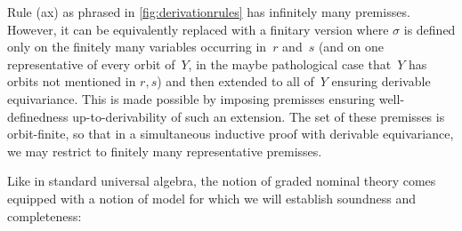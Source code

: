 \documentclass[a4paper,UKenglish,cleveref,thm-restate,numberwithinsect,final]{lipics-v2021}
\newcommand{\sigf}{\Sigma_{\mathsf f}}
\newcommand{\sigb}{\Sigma_{\mathsf b}}
\newcommand{\fresh}{\mathbin{\#}}
\theoremstyle{plain}
\numberwithin{equation}{section}
\newcommand{\+}[1]{\mathcal{#1}\xspace}
\theoremstyle{definition}
\begin{document}
\begin{remark}\label{rem:ax}
  Rule (ax) as phrased in \cref{fig:derivationrules} has infinitely
  many premisses. However, it can be equivalently replaced with a
  finitary version where $\sigma$ is defined only on the finitely many
  variables occurring in~$r$ and~$s$ (and on one representative of
  every orbit of~$Y$, in the maybe pathological case that~$Y$ has
  orbits not mentioned in $r,s$) and then extended to all of~$Y$
  ensuring derivable equivariance. This is made possible by imposing
  premisses ensuring well-definedness up-to-derivability of such an
  extension. The set of these premisses is orbit-finite, so that in a
  simultaneous inductive proof with derivable equivariance,
  we may restrict to finitely many representative premisses.
\end{remark}
\noindent Like in standard universal algebra, the notion of graded
nominal theory comes equipped with a notion of model for which we will
establish soundness and completeness:
\end{document}
